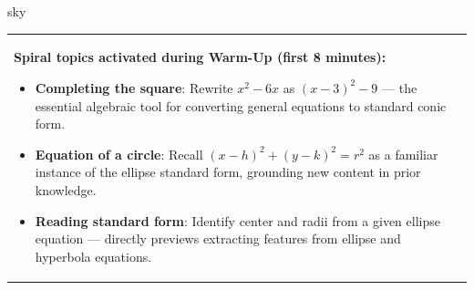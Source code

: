 \documentclass[10pt]{article}
\begin{document}
\begin{skillbox}{sky}
\begin{tabularx}{\linewidth}{@{}X c@{}}
\begin{minipage}[t]{0.96\linewidth}\vspace{0pt}
\textbf{Spiral topics activated during Warm-Up (first 8 minutes):}
\begin{itemize}[leftmargin=1.4em, itemsep=2pt]
  \item \textbf{Completing the square}: Rewrite $x^2 - 6x$ as $(x-3)^2 - 9$
    --- the essential algebraic tool for converting general equations to
    standard conic form.
  \item \textbf{Equation of a circle}: Recall $(x-h)^2 + (y-k)^2 = r^2$ as a
    familiar instance of the ellipse standard form, grounding new content in
    prior knowledge.
  \item \textbf{Reading standard form}: Identify center and radii from a
    given ellipse equation --- directly previews extracting features from
    ellipse and hyperbola equations.
\end{itemize}
\end{minipage}
&
\end{tabularx}
\end{skillbox}

\vspace{0.08in}
\end{document}
